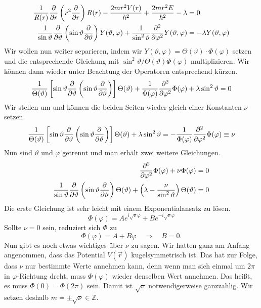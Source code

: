 \documentclass[a4paper,12pt,portrait]{book}
\numberwithin{equation}{section}
\begin{document}
\begin{align*}
\frac{1}{R(r)}\frac{\partial{}}{\partial{r}}\left(r^2\frac{\partial{}}{\partial{r}}\right)R(r)-\frac{2mr^2V(r)}{\hbar^2} + \frac{2mr^2E}{\hbar^2} -\lambda &= 0 \\
\frac{1}{\sin\vartheta}\frac{\partial{}}{\partial{\vartheta}}\left(\sin\vartheta\frac{\partial{}}{\partial{\vartheta}}\right)Y(\vartheta,\varphi) + \frac{1}{\sin^2\vartheta}\frac{\partial{^2}}{\partial{\varphi^2}}Y(\vartheta,\varphi) &= -\lambda Y(\vartheta,\varphi)
\end{align*}
Wir wollen nun weiter separieren, indem wir $Y(\vartheta,\varphi)=\Theta(\vartheta)\cdot\Phi(\varphi)$ setzen und die entsprechende Gleichung mit $\sin^2\vartheta / \Theta(\vartheta)\Phi(\varphi)$ multiplizieren. Wir können dann wieder unter Beachtung der Operatoren entsprechend kürzen.
\begin{equation*}
\frac{1}{\Theta(\vartheta)}\left[\sin\vartheta\frac{\partial{}}{\partial{\vartheta}}\left(\sin\vartheta\frac{\partial{}}{\partial{\vartheta}}\right)\right]\Theta(\vartheta) +\frac{1}{\Phi(\varphi)}\frac{\partial{^2}}{\partial{\varphi^2}}\Phi(\varphi) + \lambda\sin^2\vartheta = 0
\end{equation*}
Wir stellen um und können die beiden Seiten wieder gleich einer Konstanten $\nu$ setzen.
\begin{equation*}
\frac{1}{\Theta(\vartheta)}\left[\sin\vartheta\frac{\partial{}}{\partial{\vartheta}}\left(\sin\vartheta\frac{\partial{}}{\partial{\vartheta}}\right)\right]\Theta(\vartheta) + \lambda\sin^2\vartheta = -\frac{1}{\Phi(\varphi)}\frac{\partial{^2}}{\partial{\varphi^2}}\Phi(\varphi) \equiv \nu
\end{equation*}
Nun sind $\vartheta$ und $\varphi$ getrennt und man erhält zwei weitere Gleichungen.
\begin{align*}
\frac{\partial{^2}}{\partial{\varphi^2}}\Phi(\varphi)+\nu\Phi(\varphi) &=0\\
\frac{1}{\sin\vartheta}\frac{\partial{}}{\partial{\vartheta}}\left(\sin\vartheta\frac{\partial{}}{\partial{\vartheta}}\right)\Theta(\vartheta) + \left(\lambda - \frac{\nu}{\sin^2\vartheta}\right)\Theta(\vartheta) &= 0 
\end{align*}
Die erste Gleichung ist sehr leicht mit einem Exponentialansatz zu lösen.
\begin{equation*}
\Phi(\varphi) = Ae^{i\sqrt{\nu}\varphi} + B e^{-i\sqrt{\nu}\varphi}
\end{equation*}
Sollte $\nu = 0$ sein, reduziert sich $\Phi$ zu
\begin{equation*}
\Phi(\varphi)=A+B\varphi \quad\Longrightarrow\quad B=0.
\end{equation*}
Nun gibt es noch etwas wichtiges über $\nu$ zu sagen. Wir hatten ganz am Anfang angenommen, dass das Potential $V(\vec{r})$ kugelsymmetrisch ist. Das hat zur Folge, dass $\nu$ nur bestimmte Werte annehmen kann, denn wenn man sich einmal um $2\pi$ in $\varphi$-Richtung dreht, muss $\Phi(\varphi)$ wieder denselben Wert annehmen. Das heißt, es muss $\Phi(0)=\Phi(2\pi)$ sein. Damit ist $\sqrt{\nu}$ notwendigerweise ganzzahlig. Wir setzen deshalb $m=\pm\sqrt{\nu}\in\mathbb{Z}$.
\end{document}
